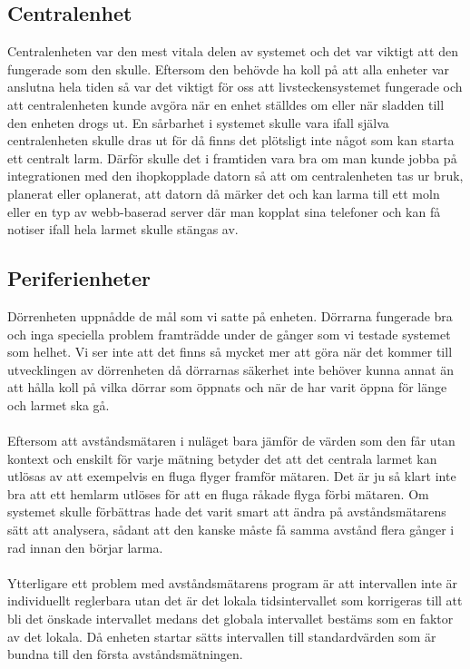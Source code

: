 \documentclass{article}
\begin{document}
\subsection{Centralenhet}
Centralenheten var den mest vitala delen av systemet och det var viktigt att den fungerade som den skulle.
Eftersom den behövde ha koll på att alla enheter var anslutna hela tiden så var det viktigt för oss att livsteckensystemet fungerade och att centralenheten kunde avgöra när en enhet ställdes om eller när sladden till den enheten drogs ut.
En sårbarhet i systemet skulle vara ifall själva centralenheten skulle dras ut för då finns det plötsligt inte något som kan starta ett centralt larm. 
Därför skulle det i framtiden vara bra om man kunde jobba på integrationen med den ihopkopplade datorn så att om centralenheten tas ur bruk, planerat eller oplanerat, att datorn då märker det och kan larma till ett moln eller en typ av webb-baserad server där man kopplat sina telefoner och kan få notiser ifall hela larmet skulle stängas av.


\subsection{Periferienheter}
\noindent
Dörrenheten uppnådde de mål som vi satte på enheten. 
Dörrarna fungerade bra och inga speciella problem framträdde under de gånger som vi testade systemet som helhet. 
Vi ser inte att det finns så mycket mer att göra när det kommer till utvecklingen av dörrenheten då dörrarnas säkerhet inte behöver kunna annat än att hålla koll på vilka dörrar som öppnats och när de har varit öppna för länge och larmet ska gå.\\
\\
Eftersom att avståndsmätaren i nuläget bara jämför de värden som den får utan kontext och enskilt för varje mätning betyder det att det centrala larmet kan utlösas av att exempelvis en fluga flyger framför mätaren.
Det är ju så klart inte bra att ett hemlarm utlöses för att en fluga råkade flyga förbi mätaren.
Om systemet skulle förbättras hade det varit smart att ändra på avståndsmätarens sätt att analysera, sådant att den kanske måste få samma avstånd flera gånger i rad innan den börjar larma.\\
\\
Ytterligare ett problem med avståndsmätarens program är att intervallen inte är individuellt reglerbara utan det är det lokala tidsintervallet som korrigeras till att bli det önskade intervallet medans det globala intervallet bestäms som en faktor av det lokala. 
Då enheten startar sätts intervallen till standardvärden som är bundna till den första avståndsmätningen. 
\end{document}
